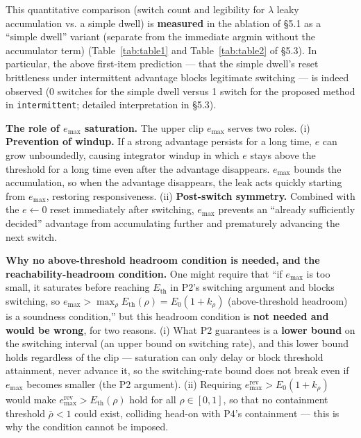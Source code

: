 \documentclass[11pt]{article}
\newcommand{\Eremax}{e^{\text{rev}}_{\max}}
\newcommand{\Eth}{E_{\text{th}}}
\newcommand{\code}[1]{\texttt{#1}}
\begin{document}
This quantitative comparison (switch count and legibility for $\lambda$ leaky accumulation vs. a simple dwell) is \textbf{measured} in the ablation of \S5.1 as a ``simple dwell'' variant (separate from the immediate argmin without the accumulator term) (Table~\ref{tab:table1} and Table~\ref{tab:table2} of \S5.3). In particular, the above first-item prediction --- that the simple dwell's reset brittleness under intermittent advantage blocks legitimate switching --- is indeed observed (0 switches for the simple dwell versus 1 switch for the proposed method in \code{intermittent}; detailed interpretation in \S5.3).

\textbf{The role of $e_{\max}$ saturation.} The upper clip $e_{\max}$ serves two roles. (i) \textbf{Prevention of windup.} If a strong advantage persists for a long time, $e$ can grow unboundedly, causing integrator windup in which $e$ stays above the threshold for a long time even after the advantage disappears. $e_{\max}$ bounds the accumulation, so when the advantage disappears, the leak acts quickly starting from $e_{\max}$, restoring responsiveness. (ii) \textbf{Post-switch symmetry.} Combined with the $e \leftarrow 0$ reset immediately after switching, $e_{\max}$ prevents an ``already sufficiently decided'' advantage from accumulating further and prematurely advancing the next switch.

\textbf{Why no above-threshold headroom condition is needed, and the reachability-headroom condition.} One might require that ``if $e_{\max}$ is too small, it saturates before reaching $\Eth$ in P2's switching argument and blocks switching, so $e_{\max} > \max_\rho \Eth(\rho) = E_0(1+k_\rho)$ (above-threshold headroom) is a soundness condition,'' but this headroom condition is \textbf{not needed and would be wrong}, for two reasons. (i) What P2 guarantees is a \textbf{lower bound} on the switching interval (an upper bound on switching rate), and this lower bound holds regardless of the clip --- saturation can only delay or block threshold attainment, never advance it, so the switching-rate bound does not break even if $e_{\max}$ becomes smaller (the P2 argument). (ii) Requiring $\Eremax > E_0(1+k_\rho)$ would make $\Eremax > \Eth(\rho)$ hold for all $\rho \in [0,1]$, so that no containment threshold $\bar\rho < 1$ could exist, colliding head-on with P4's containment --- this is why the condition cannot be imposed.
\end{document}
